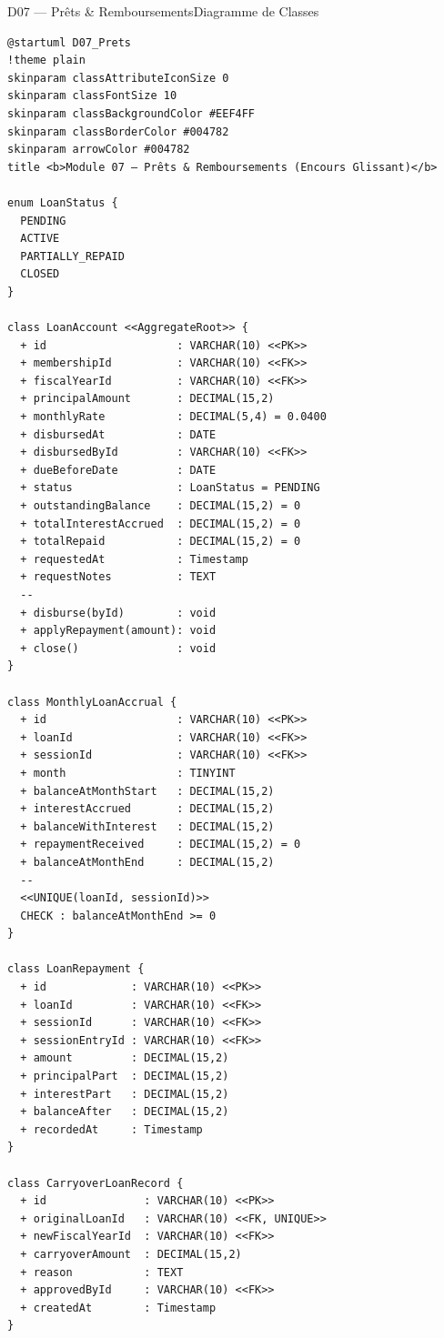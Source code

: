\documentclass[12pt, a4paper]{report}
\begin{document}
\begin{diagramBox}{D07 — Prêts \& Remboursements}{Diagramme de Classes}
\begin{lstlisting}
@startuml D07_Prets
!theme plain
skinparam classAttributeIconSize 0
skinparam classFontSize 10
skinparam classBackgroundColor #EEF4FF
skinparam classBorderColor #004782
skinparam arrowColor #004782
title <b>Module 07 — Prêts & Remboursements (Encours Glissant)</b>

enum LoanStatus {
  PENDING
  ACTIVE
  PARTIALLY_REPAID
  CLOSED
}

class LoanAccount <<AggregateRoot>> {
  + id                    : VARCHAR(10) <<PK>>
  + membershipId          : VARCHAR(10) <<FK>>
  + fiscalYearId          : VARCHAR(10) <<FK>>
  + principalAmount       : DECIMAL(15,2)
  + monthlyRate           : DECIMAL(5,4) = 0.0400
  + disbursedAt           : DATE
  + disbursedById         : VARCHAR(10) <<FK>>
  + dueBeforeDate         : DATE
  + status                : LoanStatus = PENDING
  + outstandingBalance    : DECIMAL(15,2) = 0
  + totalInterestAccrued  : DECIMAL(15,2) = 0
  + totalRepaid           : DECIMAL(15,2) = 0
  + requestedAt           : Timestamp
  + requestNotes          : TEXT
  --
  + disburse(byId)        : void
  + applyRepayment(amount): void
  + close()               : void
}

class MonthlyLoanAccrual {
  + id                    : VARCHAR(10) <<PK>>
  + loanId                : VARCHAR(10) <<FK>>
  + sessionId             : VARCHAR(10) <<FK>>
  + month                 : TINYINT
  + balanceAtMonthStart   : DECIMAL(15,2)
  + interestAccrued       : DECIMAL(15,2)
  + balanceWithInterest   : DECIMAL(15,2)
  + repaymentReceived     : DECIMAL(15,2) = 0
  + balanceAtMonthEnd     : DECIMAL(15,2)
  --
  <<UNIQUE(loanId, sessionId)>>
  CHECK : balanceAtMonthEnd >= 0
}

class LoanRepayment {
  + id             : VARCHAR(10) <<PK>>
  + loanId         : VARCHAR(10) <<FK>>
  + sessionId      : VARCHAR(10) <<FK>>
  + sessionEntryId : VARCHAR(10) <<FK>>
  + amount         : DECIMAL(15,2)
  + principalPart  : DECIMAL(15,2)
  + interestPart   : DECIMAL(15,2)
  + balanceAfter   : DECIMAL(15,2)
  + recordedAt     : Timestamp
}

class CarryoverLoanRecord {
  + id               : VARCHAR(10) <<PK>>
  + originalLoanId   : VARCHAR(10) <<FK, UNIQUE>>
  + newFiscalYearId  : VARCHAR(10) <<FK>>
  + carryoverAmount  : DECIMAL(15,2)
  + reason           : TEXT
  + approvedById     : VARCHAR(10) <<FK>>
  + createdAt        : Timestamp
}


\end{lstlisting}
\end{diagramBox}
\end{document}

